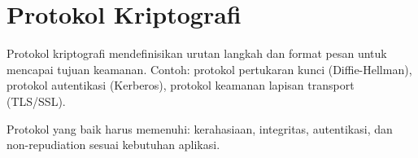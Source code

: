 \section{Protokol Kriptografi}

Protokol kriptografi mendefinisikan urutan langkah dan format pesan untuk mencapai tujuan keamanan. Contoh: protokol pertukaran kunci (Diffie-Hellman), protokol autentikasi (Kerberos), protokol keamanan lapisan transport (TLS/SSL).

Protokol yang baik harus memenuhi: kerahasiaan, integritas, autentikasi, dan non-repudiation sesuai kebutuhan aplikasi.
